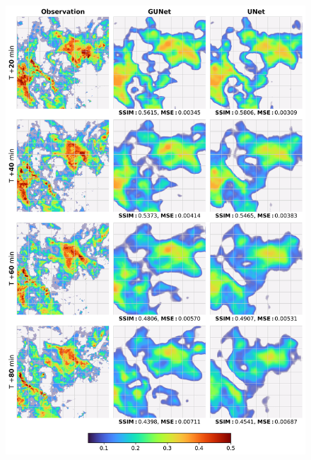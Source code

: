 \begin{figure}[ht]
    \centering
    \includegraphics[width=\textwidth]{images/comparison_square_07.png}
    \caption[Comparison of weather predictions of both models.(4)]{\label{fig:comparison_07}}
\end{figure}

